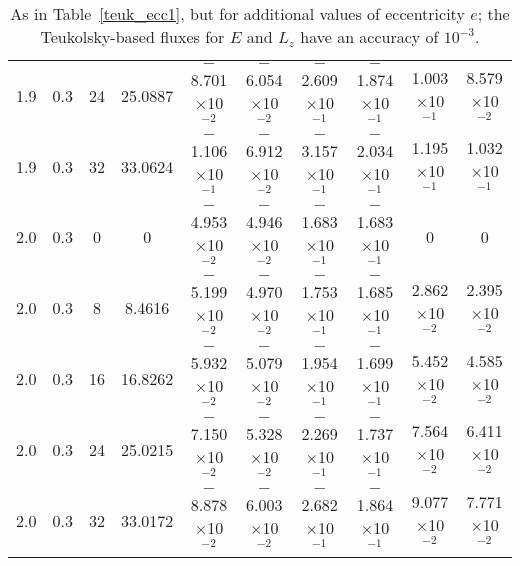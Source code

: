 \documentclass[aps,prd,twocolumn,showpacs,groupedaddress,nofootinbib]{revtex4}
\begin{document}
\begin{widetext}
\begin{table}[h]
\begin{tabular}{|c|c|c|c|c|c|c|c|c|c|}
  1.9&  0.3& 24& 25.0887& $-$8.701$\times$10$^{-2}$& $-$6.054$\times$10$^{-2}$& $-$2.609$\times$10$^{-1}$& $-$1.874$\times$10$^{-1}$&  1.003$\times$10$^{-1}$&    8.579$\times$10$^{-2}$\\
  1.9&  0.3& 32& 33.0624& $-$1.106$\times$10$^{-1}$& $-$6.912$\times$10$^{-2}$& $-$3.157$\times$10$^{-1}$& $-$2.034$\times$10$^{-1}$&  1.195$\times$10$^{-1}$&    1.032$\times$10$^{-1}$\\
  2.0&  0.3&  0&  0& $-$4.953$\times$10$^{-2}$& $-$4.946$\times$10$^{-2}$& $-$1.683$\times$10$^{-1}$& $-$1.683$\times$10$^{-1}$&  0&    0\\
  2.0&  0.3&  8&  8.4616& $-$5.199$\times$10$^{-2}$& $-$4.970$\times$10$^{-2}$& $-$1.753$\times$10$^{-1}$& $-$1.685$\times$10$^{-1}$&  2.862$\times$10$^{-2}$&    2.395$\times$10$^{-2}$\\
  2.0&  0.3& 16& 16.8262& $-$5.932$\times$10$^{-2}$& $-$5.079$\times$10$^{-2}$& $-$1.954$\times$10$^{-1}$& $-$1.699$\times$10$^{-1}$&  5.452$\times$10$^{-2}$&    4.585$\times$10$^{-2}$\\
  2.0&  0.3& 24& 25.0215& $-$7.150$\times$10$^{-2}$& $-$5.328$\times$10$^{-2}$& $-$2.269$\times$10$^{-1}$& $-$1.737$\times$10$^{-1}$&  7.564$\times$10$^{-2}$&    6.411$\times$10$^{-2}$\\
  2.0&  0.3& 32& 33.0172& $-$8.878$\times$10$^{-2}$& $-$6.003$\times$10$^{-2}$& $-$2.682$\times$10$^{-1}$& $-$1.864$\times$10$^{-1}$&  9.077$\times$10$^{-2}$&    7.771$\times$10$^{-2}$\\
\hline
\end{tabular}
\caption{As in Table~\ref{teuk_ecc1}, but for additional values of
eccentricity $e$; the Teukolsky-based fluxes for $E$ and $L_z$ have an accuracy of $10^{-3}$.\label{teuk_ecc2}}
\end{table}


\end{widetext}
\end{document}
